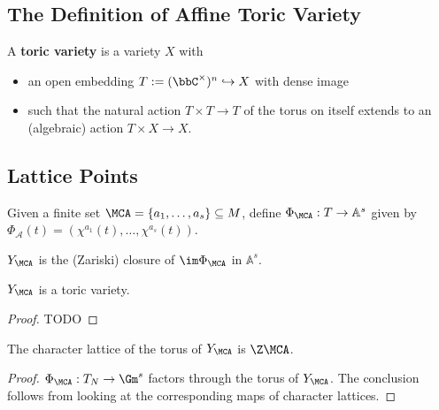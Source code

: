 \subsection{The Definition of Affine Toric Variety}


\begin{definition}
  \label{1-1-3-aff-tor-var}
  \leanok

  A {\bf toric variety} is a variety $X$ with
  \begin{itemize}
    \item an open embedding $T := (\bbC^\times)^n \hookrightarrow X$ with dense image
    \item such that the natural action $T \times T \to T$ of the torus on itself extends to an (algebraic) action $T \times X \to X$.
  \end{itemize}
\end{definition}


\subsection{Lattice Points}


\begin{definition}
  \label{1-1-phiA}

  Given a finite set $\MCA = \{a_1, \dotsc, a_s\} \subseteq M$, define $\Phi_\MCA : T \to \mathbb{A}^s$ given by $\Phi_{\mathcal A} (t) = (\chi^{a_1} (t), \dotsc, \chi^{a_s} (t))$.
\end{definition}


\begin{definition}
  \label{1-1-7-ya}

  $Y_\MCA$ is the (Zariski) closure of $\im \Phi_\MCA$ in $\mathbb A^s$.
\end{definition}


\begin{proposition}
  \label{1-1-8-aff-tor-var-ya}

  $Y_\MCA$ is a toric variety.
\end{proposition}
\begin{proof}

  TODO
\end{proof}

\begin{proposition}
  \label{1-1-8-char-ya}

  The character lattice of the torus of $Y_\MCA$ is $\Z \MCA$.
\end{proposition}
\begin{proof}

  $\Phi_\MCA: T_N \to \Gm^s$ factors through the torus of $Y_\MCA$.
  The conclusion follows from looking at the corresponding maps of character lattices.
\end{proof}

